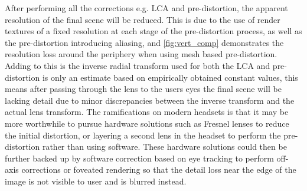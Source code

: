 \documentclass[]{article}
\begin{document}
After performing all the corrections e.g. LCA and pre-distortion, the apparent resolution of the final scene will be reduced. This is due to the use of render textures of a fixed resolution at each stage of the pre-distortion process, as well as the pre-distortion introducing aliasing, and \autoref{fig:vert_comp} demonstrates the resolution loss around the periphery when using mesh based pre-distortion. Adding to this is the inverse radial transform used for both the LCA and pre-distortion is only an estimate based on empirically obtained constant values, this means after passing through the lens to the users eyes the final scene will be lacking detail due to minor discrepancies between the inverse transform and the actual lens transform. The ramifications on modern headsets is that it may be more worthwhile to pursue hardware solutions such as Fresnel lenses to reduce the initial distortion, or layering a second lens in the headset to perform the pre-distortion rather than using software. These hardware solutions could then be further backed up by software correction based on eye tracking to perform off-axis corrections or foveated rendering so that the detail loss near the edge of the image is not visible to user and is blurred instead.

\printbibliography
\end{document}
